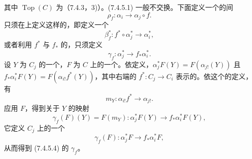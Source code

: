 其中 $\operatorname{Top}(C)$ 为（7.4.3，3)）。(7.4.5.1) 一般不交换。下面定义一个的间
\[\rho_f:\alpha_i\longrightarrow\alpha_j\circ f.\tag{7.4.5.2}\]
只须在上定义这样的，即定义一个
\[\beta_f^*:f^*\circ\alpha_j^*\longrightarrow\alpha_i^*,\tag{7.4.5.3}\]
或者利用 $f^*$ 与 $f_*$ 的，只须定义
\[\gamma_f:\alpha_j^*\longrightarrow f_*\alpha_i^*.\tag{7.4.5.4}\]
设 $Y$ 为 $C_j$ 的一个，$F$ 为 $C$ 上的一个。依定义，$\alpha_j^*F(Y)=F(\alpha_{j!}(Y))$ 且 $f_*\alpha_i^*F(Y)=F(\alpha_{i!}f^*(Y))$，其中右端的 $f^*:C_j\to C_i$ 表示的。依这个的定义，有
\[m_Y:\alpha_{i!}f^*\longrightarrow\alpha_{j!}.\tag{7.4.5.5}\]
应用 $F$，得到关于 $Y$ 的映射
\[\gamma_f(F)(Y)=F(m_Y):\alpha_j^*F(Y)\longrightarrow f_*\alpha_i^*F(Y),\tag{7.4.5.6}\]
它定义 $C_j$ 上的一个
\[\gamma_f(F):\alpha_j^*F\longrightarrow f_*\alpha_i^*F,\tag{7.4.5.7}\]
从而得到 (7.4.5.4) 的 $\gamma_f$。

